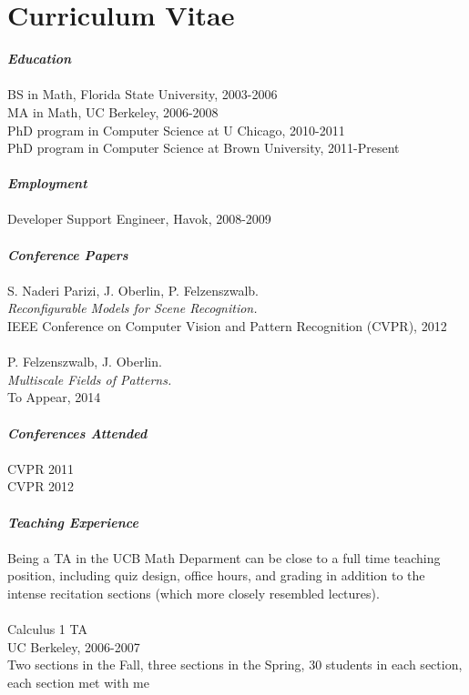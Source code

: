 \documentclass[12pt]{article}
\numberwithin{equation}{section}
\numberwithin{table}{section}
\numberwithin{figure}{section}
\begin{document}
\section{Curriculum Vitae}
\textbf{\emph{Education}}\\
 \\
BS in Math, Florida State University, 2003-2006 \\
MA in Math, UC Berkeley, 2006-2008 \\
PhD program in Computer Science at U Chicago, 2010-2011 \\
PhD program in Computer Science at Brown University, 2011-Present \\
 \\ 
\textbf{\emph{Employment}}\\
\\
Developer Support Engineer, Havok, 2008-2009 \\
 \\
\textbf{\emph{Conference Papers}}\\
 \\
S. Naderi Parizi, J. Oberlin, P. Felzenszwalb.\\
\emph{Reconfigurable Models for Scene Recognition.}\\
IEEE Conference on Computer Vision and Pattern Recognition (CVPR), 2012\\
 \\
P. Felzenszwalb, J. Oberlin.  \\
\emph{Multiscale Fields of Patterns.}\\
To Appear, 2014 \\
 \\
\textbf{\emph{Conferences Attended}}\\
 \\
CVPR 2011\\
CVPR 2012 \\
 \\
\textbf{\emph{Teaching Experience}}\\
 \\
Being a TA in the UCB Math Deparment can be close to a full time teaching position, including
quiz design, office hours, and grading in addition to the intense recitation sections (which more closely resembled lectures). \\
\\
Calculus 1 TA\\
UC Berkeley, 2006-2007\\
Two sections in the Fall, three sections in the Spring, 30 students in each section, each section met with me
\end{document}
